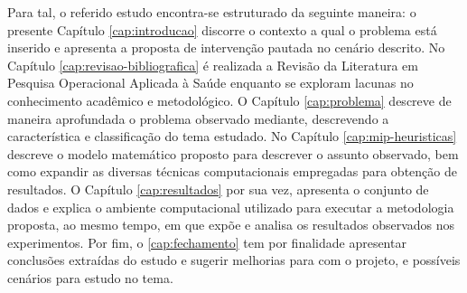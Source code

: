 Para tal, o referido estudo encontra-se estruturado da seguinte maneira: o presente Capítulo \ref{cap:introducao} discorre o contexto a qual o problema está inserido e apresenta a proposta de intervenção pautada no cenário descrito. No Capítulo \ref{cap:revisao-bibliografica} é realizada a Revisão da Literatura em Pesquisa Operacional Aplicada à Saúde enquanto se exploram lacunas no conhecimento acadêmico e metodológico. O Capítulo \ref{cap:problema} descreve de maneira aprofundada o problema observado mediante, descrevendo a característica e classificação do tema estudado. No Capítulo \ref{cap:mip-heuristicas} descreve o modelo matemático proposto para descrever o assunto observado, bem como expandir as diversas técnicas computacionais empregadas para obtenção de resultados. O Capítulo \ref{cap:resultados} por sua vez, apresenta o conjunto de dados e explica o ambiente computacional utilizado para executar a metodologia proposta, ao mesmo tempo, em que expõe e analisa os resultados observados nos experimentos. Por fim, o \ref{cap:fechamento} tem por finalidade apresentar conclusões extraídas do estudo e sugerir melhorias para com o projeto, e possíveis cenários para estudo no tema.